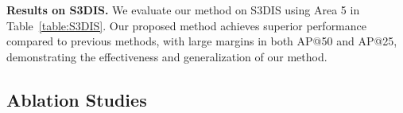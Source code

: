 \textbf{Results on S3DIS.}
We evaluate our method on S3DIS using Area 5 in Table~\ref{table:S3DIS}. Our proposed method achieves superior performance compared to previous methods, with large margins in both AP@50 and AP@25, demonstrating the effectiveness and generalization of our method.


\subsection{Ablation Studies}


